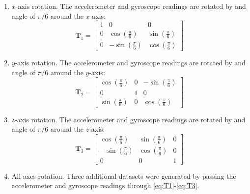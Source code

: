 \documentclass[journal]{IEEEtran}
\begin{document}
\begin{enumerate}
    \item $x$-axis rotation. The accelerometer and gyroscope readings are rotated by and angle of $\pi/6$ around the $x$-axis:
    \begin{equation}\label{eq:T1}
    \mathbf{T}_1 = \begin{bmatrix}
    1 & 0 & 0 \\
    0 & \cos\left(\frac{\pi}{6}\right) & \sin\left(\frac{\pi}{6}\right) \\
    0 & -\sin\left(\frac{\pi}{6}\right) & \cos\left(\frac{\pi}{6}\right)
    \end{bmatrix}
    \end{equation}
    \item $y$-axis rotation. The accelerometer and gyroscope readings are rotated by and angle of $\pi/6$ around the $y$-axis:
    \begin{equation}\label{eq:T2}
    \mathbf{T}_2 = \begin{bmatrix}
        \cos\left(\frac{\pi}{6}\right) & 0 & -\sin\left(\frac{\pi}{6}\right) \\
        0 & 1 & 0 \\
        \sin\left(\frac{\pi}{6}\right) & 0 & \cos\left(\frac{\pi}{6}\right)
        \end{bmatrix}
    \end{equation}
    \item $z$-axis rotation. The accelerometer and gyroscope readings are rotated by and angle of $\pi/6$ around the $z$-axis:
    \begin{equation} \label{eq:T3}
    \mathbf{T}_3  = \begin{bmatrix}
    \cos\left(\frac{\pi}{6}\right) & \sin\left(\frac{\pi}{6}\right) & 0 \\
    -\sin\left(\frac{\pi}{6}\right) & \cos\left(\frac{\pi}{6}\right) & 0 \\
    0 & 0 & 1
    \end{bmatrix}
    \end{equation}
    \item All axes rotation. Three additional datasets were generated by passing the accelerometer and gyroscope readings through \eqref{eq:T1}-\eqref{eq:T3}.
\end{enumerate}
%
\end{document}
